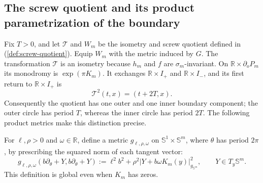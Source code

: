 \documentclass[11pt,reqno]{amsart}
\theoremstyle{definition}
\numberwithin{equation}{section}
\begin{document}
\subsection{The screw quotient and its product parametrization of the boundary}

Fix $T>0$, and let $\mathcal T$ and $W_m$ be the isometry and screw
quotient defined in (\ref{def:screw-quotient}).  Equip $W_m$ with the metric
induced by $G$.  The transformation
$\mathcal T$ is an isometry because $h_m$ and $f$ are
$\sigma_m$-invariant.  On $\mathbb R\times\partial_oP_m$ its monodromy
is $\exp(\pi K_m)$.  It exchanges
$\mathbb R\times I_+$ and $\mathbb R\times I_-$, and its first return to
$\mathbb R\times I_+$ is
\[
 \mathcal T^2(t,x)=(t+2T,x).
\]
Consequently the quotient has one outer and one inner boundary
component; the outer circle has period $T$, whereas the inner circle
has period $2T$.  The following product metrics make this distinction
precise.

For \(\ell,\rho>0\) and \(\omega\in\mathbb R\), define a metric
\(g_{\ell,\rho,\omega}\) on
\(\mathbb S^1\times\mathbb S^m\), where \(\theta\) has period \(2\pi\),
by prescribing the squared norm of each tangent vector:
\begin{equation}\label{eq:un-boundary-metric-definition}
 g_{\ell,\rho,\omega}(b\partial_\theta+Y,b\partial_\theta+Y)
 :=\ell^2b^2+\rho^2
   \lvert Y+b\omega K_m(y)\rvert_{g_{\mathbb S^m}}^2,
 \qquad Y\in T_y\mathbb S^m.
\end{equation}
This definition is global even when \(K_m\) has zeros.
\end{document}
